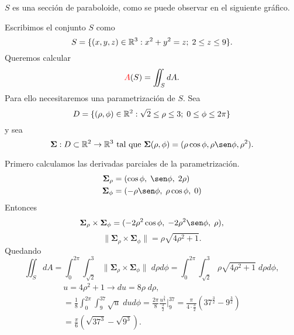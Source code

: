 \begin{solution}
  $S$ es una secci\'on de paraboloide, como se puede observar en el siguiente gr\'afico.

  \begin{center}
  \end{center}

  Escribimos el conjunto $S$ como
  \[
    S=\{(x,y,z)\in \mathbb{R}^3: x^2+y^2=z;\;2\leq z\leq 9 \}.
  \]
  Queremos calcular \[ \textcolor{red}{A}(S) = \iint_S dA.\]
  Para ello necesitaremos una parametrizaci\'on de $S$. Sea
  $$D=\{(\rho, \phi) \in\mathbb{R}^2:    \sqrt{2}\leq \rho \leq 3;\;0\leq  \phi \leq 2\pi \}$$  y  sea  $$\boldsymbol{\Sigma}:D \subset\Rn{2}\to\Rn{3}  \mbox{ tal que }   \boldsymbol{\Sigma}(\rho, \phi)=(\rho \cos\phi, \rho \sen\phi , \rho^{2}).$$

  Primero calculamos las derivadas parciales de la parametrizaci\'on.
  \begin{align*}
    \boldsymbol{\Sigma}_{\rho} & =(\cos \phi,\;\sen \phi,\; 2\rho)         \\
    \boldsymbol{\Sigma}_\phi   & =(  -\rho \sen \phi,\;\rho \cos \phi,\;0)
  \end{align*}
  Entonces
  $$
    \boldsymbol{\Sigma}_{\rho} \times\boldsymbol{\Sigma}_\phi =
    (-2\rho^2 \cos\phi  , \;-2\rho^2 \sen \phi, \;\rho),
  $$
  $$\|  \boldsymbol{\Sigma}_{\rho} \times\boldsymbol{\Sigma}_\phi\|
    = \rho\sqrt{4\rho^2+1}.$$
  Quedando
  \begin{equation}
    \iint_S dA
    = \int_0^{2\pi} \int_{\sqrt{2}}^3 \|\boldsymbol{\Sigma}_{\rho}
    \times\boldsymbol{\Sigma}_\phi \| \; d\rho d\phi
    = \int_0^{2\pi} \int_{\sqrt{2}}^3 \rho\sqrt{4\rho^2+1}\;d\rho d\phi,
    \label{eq:integral1}
  \end{equation}
  \begin{gather*}
  u=4\rho^2+1 \rightarrow du = 8\rho\;d\rho, 
  \\[.2cm]
  = \frac{1}{8}\int_0^{2\pi} \int_9^{37} \sqrt{u}\;du d\phi
  = \frac{2\pi}{8}\frac{u^{\frac{3}{2}}}{\frac{3}{2}}\Bigg|_9^{37}
  = \frac{\pi}{4\cdot\frac{3}{2}} (37^{\frac{3}{2}} - 9^{\frac{3}{2}}) 
  \\[.2cm]
  = \frac{\pi}{6} (\sqrt{37^3} - \sqrt{9^3}).
  \end{gather*}
\end{solution}

